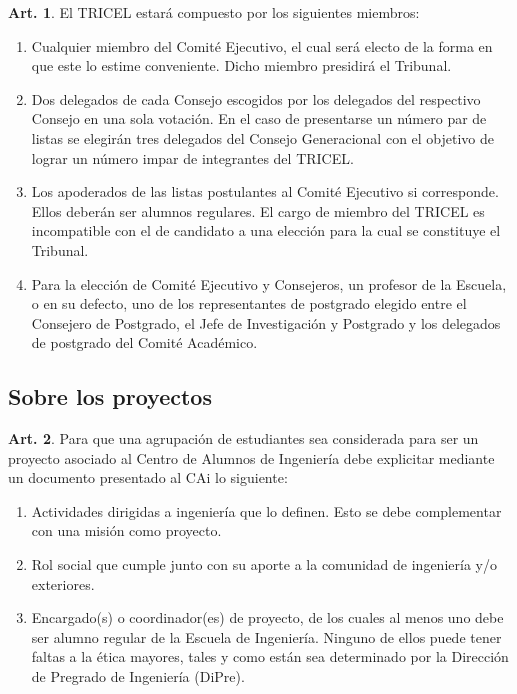\documentclass[letterpaper,11pt]{article}
\theoremstyle{definition}%
\newtheorem{art}{Art.} %
\begin{document}
\begin{art}\label{composicionTRICEL}
	El TRICEL estará compuesto por los siguientes miembros:
	\begin{enumerate}
		\item Cualquier miembro del Comité Ejecutivo, el cual será electo de la forma en que este lo estime conveniente. Dicho miembro presidirá el Tribunal.
		\item Dos delegados de cada  Consejo escogidos por los delegados del respectivo Consejo en una sola votación. En el caso de presentarse un número par de listas se elegirán tres delegados del Consejo Generacional con el objetivo de lograr un número impar de integrantes del TRICEL\@.
		\item Los apoderados de las listas postulantes al Comité Ejecutivo si corresponde. Ellos deberán ser alumnos regulares. El cargo de miembro del TRICEL es incompatible con el de candidato a una elección para la cual se constituye el Tribunal.
		\item Para la elección de Comité Ejecutivo y Consejeros, un profesor de la Escuela, o en su defecto, uno de los representantes de postgrado elegido entre el Consejero de Postgrado, el Jefe de Investigación y Postgrado y los delegados de postgrado del Comité Académico.
	\end{enumerate}
\end{art}

\subsection*{Sobre los proyectos}

\begin{art}
	Para que una agrupación de estudiantes sea considerada para ser un proyecto asociado al Centro de Alumnos de Ingeniería debe explicitar mediante un documento presentado al CAi lo siguiente:

	\begin{enumerate}
		\item Actividades dirigidas a ingeniería que lo definen. Esto se debe complementar con una misión como proyecto.
		\item Rol social que cumple junto con su aporte a la comunidad de ingeniería y/o exteriores.
		\item Encargado(s) o coordinador(es) de proyecto, de los cuales al menos uno debe ser alumno regular de la Escuela de Ingeniería. Ninguno de ellos puede tener faltas a la ética mayores, tales y como están sea determinado por la Dirección de Pregrado de Ingeniería (DiPre).
	\end{enumerate}

\end{art}
\end{document}
